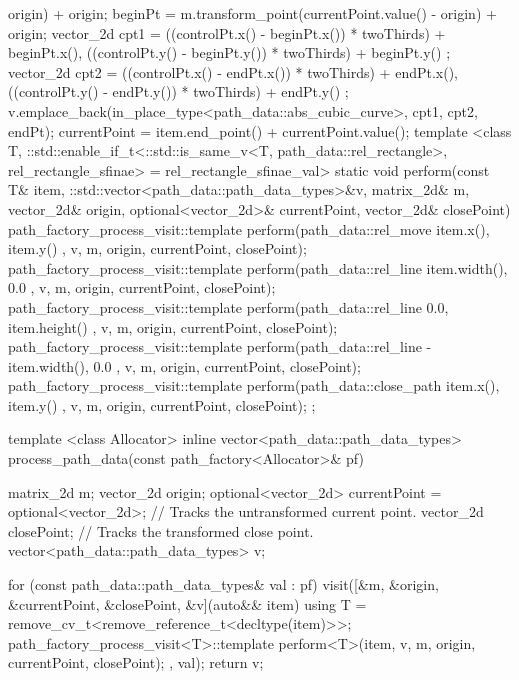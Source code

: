 \begin{codeblock}
{{{          origin) + origin;
        beginPt = m.transform_point(currentPoint.value() - origin) + origin;
        vector_2d cpt1 = { ((controlPt.x() - beginPt.x()) * twoThirds) + beginPt.x(), ((controlPt.y() - beginPt.y()) * twoThirds) + beginPt.y() };
        vector_2d cpt2 = { ((controlPt.x() - endPt.x()) * twoThirds) + endPt.x(), ((controlPt.y() - endPt.y()) * twoThirds) + endPt.y() };
        v.emplace_back(in_place_type<path_data::abs_cubic_curve>, cpt1, cpt2, endPt);
        currentPoint = item.end_point() + currentPoint.value();
      }
      template <class T, ::std::enable_if_t<::std::is_same_v<T, path_data::rel_rectangle>, rel_rectangle_sfinae> = rel_rectangle_sfinae_val>
      static void perform(const T& item, ::std::vector<path_data::path_data_types>&v, matrix_2d& m, vector_2d& origin, optional<vector_2d>& currentPoint, vector_2d& closePoint) {
        path_factory_process_visit::template perform(path_data::rel_move{ { item.x(), item.y() } }, v, m, origin, currentPoint, closePoint);
        path_factory_process_visit::template perform(path_data::rel_line{ { item.width(), 0.0 } }, v, m, origin, currentPoint, closePoint);
        path_factory_process_visit::template perform(path_data::rel_line{ { 0.0, item.height() } }, v, m, origin, currentPoint, closePoint);
        path_factory_process_visit::template perform(path_data::rel_line{ { -item.width(), 0.0 } }, v, m, origin, currentPoint, closePoint);
        path_factory_process_visit::template perform(path_data::close_path{ { item.x(), item.y() } }, v, m, origin, currentPoint, closePoint);
      }
    };
  
    template <class Allocator>
    inline vector<path_data::path_data_types> process_path_data(const path_factory<Allocator>& pf) {
      matrix_2d m;
      vector_2d origin;
      optional<vector_2d> currentPoint = optional<vector_2d>{}; // Tracks the untransformed current point.
      vector_2d closePoint;   // Tracks the transformed close point.
      vector<path_data::path_data_types> v;
  
      for (const path_data::path_data_types& val : pf) {
        visit([&m, &origin, &currentPoint, &closePoint, &v](auto&& item) {
          using T = remove_cv_t<remove_reference_t<decltype(item)>>;
          path_factory_process_visit<T>::template perform<T>(item, v, m, origin, currentPoint, closePoint);
        }, val);
      }
      return v;
    }
  }
\end{codeblock}
